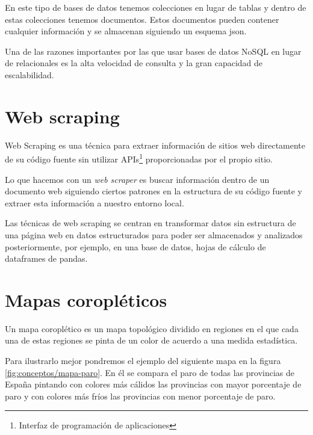 En este tipo de bases de datos tenemos colecciones en lugar de tablas y dentro de estas colecciones tenemos documentos. Estos documentos pueden contener cualquier información y se almacenan siguiendo un esquema json.

Una de las razones importantes por las que usar bases de datos NoSQL en lugar de relacionales es la alta velocidad de consulta y la gran capacidad de escalabilidad.


\section{Web scraping} \label{webscraping}

Web Scraping \cite{wiki:webscraping} es una técnica para extraer información de sitios web directamente de su código fuente sin utilizar APIs\footnote{Interfaz de programación de aplicaciones} proporcionadas por el propio sitio.

Lo que hacemos con un \textit{web scraper} es buscar información dentro de un documento web siguiendo ciertos patrones en la estructura de su código fuente y extraer esta información a nuestro entorno local.

Las técnicas de web scraping se centran en transformar datos sin estructura de una página web en datos estructurados para poder ser almacenados y analizados posteriormente, por ejemplo, en una base de datos, hojas de cálculo de dataframes de pandas.


\section{Mapas coropléticos} \label{mapascoropleticos}

Un mapa coroplético \cite{wiki:mapascoropleticos} es un mapa topológico dividido en regiones en el que cada una de estas regiones se pinta de un color de acuerdo a una medida estadística.

Para ilustrarlo mejor pondremos el ejemplo del siguiente mapa en la figura \ref{fig:conceptos/mapa-paro}. En él se compara el paro de todas las provincias de España pintando con colores más cálidos las provincias con mayor porcentaje de paro y con colores más fríos las provincias con menor porcentaje de paro.


